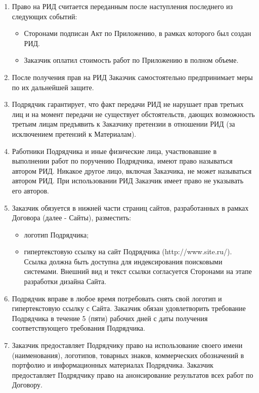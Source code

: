 \documentclass[14pt,a4paper]{article}
\begin{document}
\begin{enumerate}
\begin{enumerate}
		\item Право на РИД считается переданным после наступления последнего из следующих событий:
		\begin{itemize}
			\item Сторонами подписан Акт по Приложению, в рамках которого был создан РИД.
			\item Заказчик оплатил стоимость работ по Приложению в полном объеме.
		\end{itemize}

		\item После получения прав на РИД Заказчик самостоятельно предпринимает меры по их дальнейшей защите.

		\item Подрядчик гарантирует, что факт передачи РИД не нарушает прав третьих лиц и на момент передачи не существует обстоятельств, дающих возможность третьим лицам предъявить к Заказчику претензии в отношении РИД (за исключением претензий к Материалам).

		\item Работники Подрядчика и иные физические лица, участвовавшие в выполнении работ по поручению Подрядчика, имеют право называться автором РИД. Никакое другое лицо, включая Заказчика, не может называться автором РИД. При использовании РИД Заказчик имеет право не указывать его авторов.

		\item Заказчик обязуется в нижней части страниц сайтов, разработанных в рамках Договора (далее - Сайты), разместить:
		\begin{itemize}
			\item логотип Подрядчика;
			\item гипертекстовую ссылку на сайт Подрядчика (http://www.site.ru/). Ссылка должна быть доступна для индексирования поисковыми системами. Внешний вид и текст ссылки согласуется Сторонами на этапе разработки дизайна Сайта.
		\end{itemize}

		\item Подрядчик вправе в любое время потребовать снять свой логотип и гипертекстовую ссылку с Сайта. Заказчик обязан удовлетворить требование Подрядчика в течение 5 (пяти) рабочих дней с даты получения соответствующего требования Подрядчика.

		\item Заказчик предоставляет Подрядчику право на использование своего имени (наименования), логотипов, товарных знаков, коммерческих обозначений в портфолио и информационных материалах Подрядчика. Заказчик предоставляет Подрядчику право на анонсирование результатов всех работ по Договору.
	\end{enumerate}


\end{enumerate}
\end{document}
